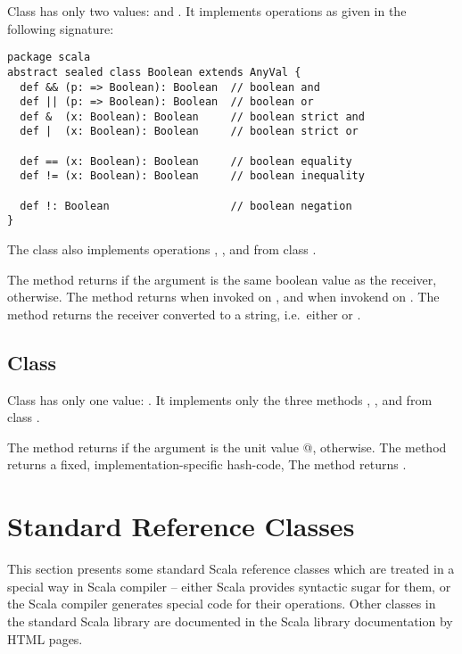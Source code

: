 {Class  has only two values:  and
. It implements operations as given in the following
signature:

\begin{lstlisting}
package scala 
abstract sealed class Boolean extends AnyVal {
  def && (p: => Boolean): Boolean  // boolean and
  def || (p: => Boolean): Boolean  // boolean or
  def &  (x: Boolean): Boolean     // boolean strict and
  def |  (x: Boolean): Boolean     // boolean strict or

  def == (x: Boolean): Boolean     // boolean equality
  def != (x: Boolean): Boolean     // boolean inequality

  def !: Boolean                   // boolean negation
}
\end{lstlisting}
The class also implements operations , ,
and  from class .

The  method returns  if the argument is the
same boolean value as the receiver,  otherwise.  The
 method returns  when invoked on , 
and  when invokend on . The  method
returns the receiver converted to a string, i.e.\ either 
or .

\subsection{Class \large{}}

Class  has only one value: \code{()}. It implements only
the three methods , , and 
from class .

The  method returns  if the argument is the
unit value \lstinline@{}@,  otherwise.  The
 method returns a fixed, implementation-specific hash-code, 
The  method returns .

\section{Standard Reference Classes}
\label{cls:reference}

This section presents some standard Scala reference classes which are
treated in a special way in Scala compiler -- either Scala provides
syntactic sugar for them, or the Scala compiler generates special code
for their operations. Other classes in the standard Scala library are
documented in the Scala library documentation by HTML pages.

}
